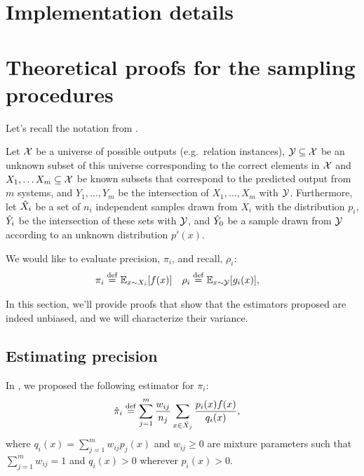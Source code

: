 \onecolumn
\section{Implementation details}
\label{sec:implementation}

\section{Theoretical proofs for the sampling procedures}
\label{app:sampling}

Let's recall the notation from .

Let $\mathcal{X}$ be a universe of possible outputs (e.g.\ relation instances),
  $\mathcal{Y} \subseteq \mathcal{X}$ be an unknown subset of this universe corresponding to the correct elements in $\mathcal{X}$ and
  $X_1, \ldots X_m \subseteq \mathcal{X}$ be known subsets that correspond to the predicted output from $m$ systems,
  and $Y_1, \ldots, Y_m$ be the intersection of $X_1, \ldots, X_m$ with $\mathcal{Y}$.
Furthermore, 
  let ${\hat{X}}_i$ be a set of $n_i$ independent samples drawn from $X_i$ with the distribution $p_i$,
  ${\hat{Y}}_i$ be the intersection of these sets with $\mathcal{Y}$, and
  ${\hat{Y}}_0$ be a sample drawn from $\mathcal{Y}$ according to an unknown distribution $p'(x)$.

We would like to evaluate precision, $\pi_i$, and recall, $\rho_i$:
\begin{align*}
  \pi_i  &\stackrel{\rm def}{=} \mathbb{E}_{x \sim X_i}[f(x)] &
  \rho_i &\stackrel{\rm def}{=} \mathbb{E}_{x \sim \mathcal{Y}}[g_i(x)],
\end{align*}

In this section, we'll provide proofs that show that the estimators proposed are indeed unbiased, and we will characterize their variance.

\subsection{Estimating precision}

In , we proposed the following estimator for $\pi_i$:
\begin{align*}
  {\hat{\pi}}_i &\stackrel{\rm def}{=} \sum_{j=1}^m \frac{w_{ij}}{n_j} \sum_{x \in {\hat{X}}_j} \frac{p_i(x) f(x)}{q_i(x)},
\end{align*}
where $q_i(x) = \sum_{j=1}^m w_{ij} p_j(x)$ and $w_{ij} \ge 0$ are mixture parameters such that $\sum_{j=1}^m w_{ij} = 1$ and $q_i(x) > 0$ wherever $p_i(x) > 0$.

